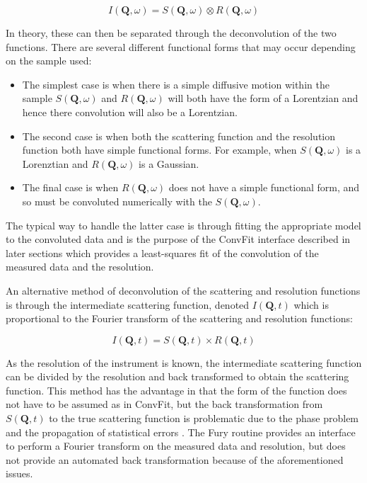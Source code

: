 \documentclass[paper=a4, fontsize=11pt]{scrartcl}	%
\numberwithin{equation}{section}															%
\numberwithin{figure}{section}																%
\numberwithin{table}{section}																%
\begin{document}
\begin{equation}
I(\mathbf{Q}, \omega) = S(\mathbf{Q}, \omega) \otimes R(\mathbf{Q}, \omega)
\end{equation}

In theory, these can then be separated through the deconvolution of the two functions. There are several different functional forms that may occur depending on the sample used:

\begin{itemize}
\item The simplest case is when there is a simple diffusive motion within the sample $S(\mathbf{Q},\omega)$ and $R(\mathbf{Q},\omega)$ will both have the form of a Lorentzian and hence there convolution will also be a Lorentzian.

\item The second case is when both the scattering function and the resolution function both have simple functional forms. For example, when $S(\mathbf{Q},\omega)$ is a Lorenztian and $R(\mathbf{Q},\omega)$ is a Gaussian.

\item The final case is when $R(\mathbf{Q}, \omega)$ does not have a simple functional form, and so must be convoluted numerically with the $S(\mathbf{Q}, \omega)$.
\end{itemize}

The typical way to handle the latter case is through fitting the appropriate model to the convoluted data and is the purpose of the ConvFit interface described in later sections which provides a least-squares fit of the convolution of  the measured data and the resolution.

An alternative method of deconvolution of the scattering and resolution functions is through the intermediate scattering function, denoted $I(\mathbf{Q}, t)$ which is proportional to the Fourier transform of the scattering and resolution functions:

\begin{equation}
I(\mathbf{Q}, t) = S(\mathbf{Q}, t) \times R(\mathbf{Q}, t)
\end{equation}

As the resolution of the instrument is known, the intermediate scattering function can be divided by the resolution and back transformed to obtain the scattering function. This method has the advantage in that the form of the function does not have to be assumed as in ConvFit, but the back transformation from $S(\mathbf{Q}, t)$ to the true scattering function is problematic due to the phase problem \cite{dssivia2011} and the propagation of statistical errors \cite{wild1977measurement}. The Fury routine provides an interface to perform a Fourier transform on the measured data and resolution, but does not provide an automated back transformation because of the aforementioned issues.
\end{document}

